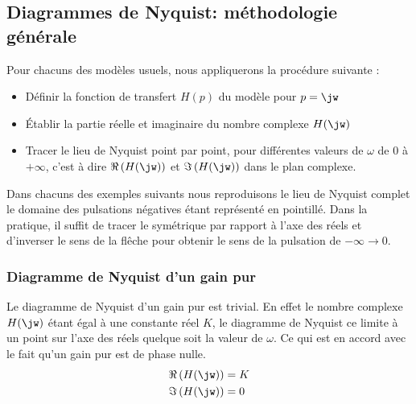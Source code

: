 \subsection{Diagrammes de Nyquist: méthodologie générale}

Pour chacuns des modèles usuels, nous appliquerons la procédure suivante :
\begin{itemize}                                                                                                               
    \item Définir la fonction de transfert $H(p)$ du modèle pour $p=\jw$                                                      
    \item \'Etablir la partie réelle et imaginaire du nombre complexe $H(\jw)$                                          
    \item Tracer le lieu de Nyquist point par point, pour différentes valeurs de 
        $\omega$ de 0 à $+\infty$, c'est à dire $\Re\left(H(\jw)\right)$ 
          et $\Im\left(H(\jw)\right)$ dans le plan complexe.
\end{itemize}
Dans chacuns des exemples suivants nous reproduisons le lieu de Nyquist complet le domaine des pulsations
négatives étant représenté en pointillé. Dans la pratique, il suffit de tracer le symétrique par rapport à 
l'axe des réels et d'inverser le sens de la flêche pour obtenir le sens de la pulsation de $-\infty\to 0$. 

\subsubsection{Diagramme de Nyquist d'un gain pur}
Le diagramme de Nyquist d'un gain pur est trivial. En effet le nombre complexe $H(\jw)$ étant égal 
à une constante réel $K$, le diagramme de Nyquist ce limite à un point sur l'axe des réels quelque soit la valeur de $\omega$.
Ce qui est en accord avec le fait qu'un gain pur est de phase nulle.
\begin{align*}
    \Re\left(H(\jw)\right)&=K\\
    \Im\left(H(\jw)\right)&=0\\
\end{align*}

